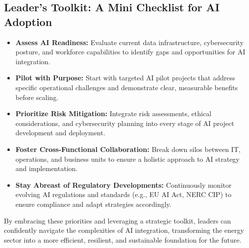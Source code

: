 \subsection{Leader's Toolkit: A Mini Checklist for AI Adoption}
\begin{itemize}
    \item \textbf{Assess AI Readiness:} Evaluate current data infrastructure, cybersecurity posture, and workforce capabilities to identify gaps and opportunities for AI integration.
    \item \textbf{Pilot with Purpose:} Start with targeted AI pilot projects that address specific operational challenges and demonstrate clear, measurable benefits before scaling.
    \item \textbf{Prioritize Risk Mitigation:} Integrate risk assessments, ethical considerations, and cybersecurity planning into every stage of AI project development and deployment.
    \item \textbf{Foster Cross-Functional Collaboration:} Break down silos between IT, operations, and business units to ensure a holistic approach to AI strategy and implementation.
    \item \textbf{Stay Abreast of Regulatory Developments:} Continuously monitor evolving AI regulations and standards (e.g., EU AI Act, NERC CIP) to ensure compliance and adapt strategies accordingly.
\end{itemize}

By embracing these priorities and leveraging a strategic toolkit, leaders can confidently navigate the complexities of AI integration, transforming the energy sector into a more efficient, resilient, and sustainable foundation for the future.